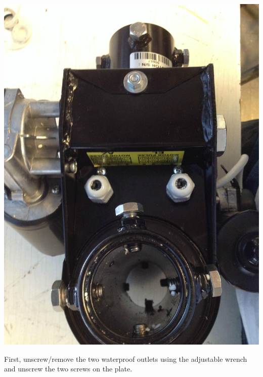 \documentclass[11pt]{article} %
\begin{document}
\begin{center}
\includegraphics[scale=0.10]{wiring/01.jpeg}
\end{center}

First, unscrew/remove the two waterproof outlets using the adjustable wrench and unscrew the two screws on the plate.
\end{document}
